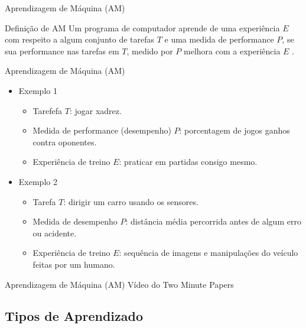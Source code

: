 \documentclass{libs/ufc_format}
\begin{document}
\begin{frame}{Aprendizagem de Máquina (AM)}
    \begin{block}{Definição de AM}
        \justifying
        Um programa de computador aprende de uma experiência $E$ com respeito a algum conjunto de tarefas $T$ e uma medida de performance $P$, se sua performance nas tarefas em $T$, medido por $P$ melhora com a experiência $E$ \cite{m97}.
    \end{block}
\end{frame}

\begin{frame}{Aprendizagem de Máquina (AM)}
    \begin{itemize}
        \item<1> Exemplo 1
            \begin{itemize}
                \justifying
                \item<1> Tarefefa $T$: jogar xadrez.
                \item<1> Medida de performance (desempenho) $P$: porcentagem de jogos ganhos contra oponentes.
                \item<1> Experiência de treino $E$: praticar em partidas consigo mesmo.
            \end{itemize}
        \item<2> Exemplo 2
            \begin{itemize}
                \item<2> Tarefa $T$: dirigir um carro usando os sensores.
                \item<2> Medida de desempenho $P$: distância média percorrida antes de algum erro ou acidente.
                \item<2> Experiência de treino $E$: sequência de imagens e manipulações do veículo feitas por um humano.
            \end{itemize}
    \end{itemize}
\end{frame}

\begin{frame}{Aprendizagem de Máquina (AM)}
\centering
\large
Vídeo do Two Minute Papers \cite{tmp19}
\end{frame}

\subsection{Tipos de Aprendizado}
\end{document}
